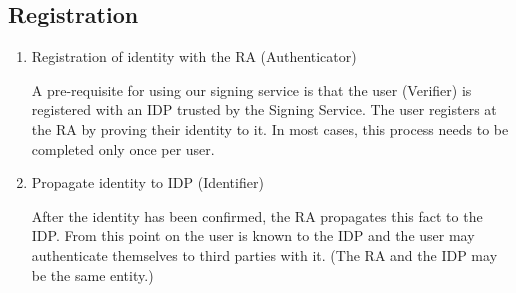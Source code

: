 \subsection{Registration}\label{subsec:registration}
\begin{enumerate}
    \item Registration of identity with the \gls{RA} (Authenticator)

    A pre-requisite for using our signing service is that the user (Verifier) is registered with an \gls{IDP} trusted by the Signing Service.
    The user registers at the \gls{RA} by proving their identity to it.
    In most cases, this process needs to be completed only once per user.

    \item Propagate identity to \gls{IDP} (Identifier)

    After the identity has been confirmed, the \gls{RA} propagates this fact to the \gls{IDP}.
    From this point on the user is known to the \gls{IDP} and the user may authenticate themselves to third parties with it.
    (The \gls{RA} and the \gls{IDP} may be the same entity.)

\end{enumerate}

